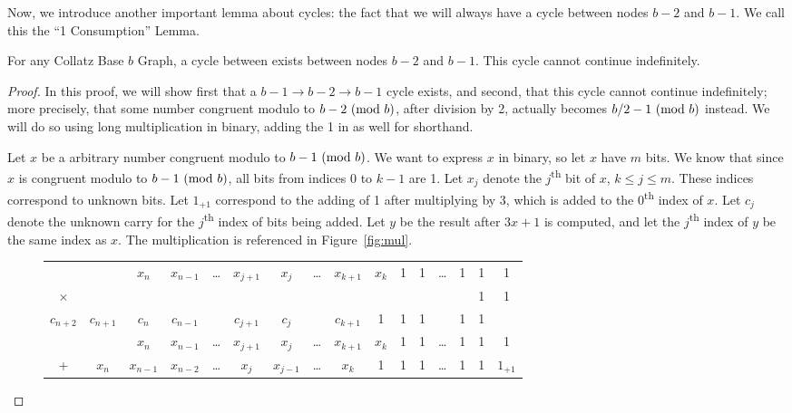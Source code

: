 Now, we introduce another important lemma about cycles: the fact that we will always have a cycle between nodes $b-2$ and $b-1$. We call this the ``1 Consumption'' Lemma.
\begin{lemma}
\label{lem:oneConsumption}
 For any Collatz Base $b$ Graph, a cycle between exists between nodes $b-2$ and $b-1$. This cycle cannot continue indefinitely.
\end{lemma}
\begin{proof}
In this proof, we will show first that a $b-1 \rightarrow b-2 \rightarrow b-1$ cycle exists, and second, that this cycle cannot continue indefinitely; more precisely, that some number congruent modulo to $b-2 \ (\mathrm{mod}\ b)$, after division by 2, actually becomes $b/2-1 \ (\mathrm{mod}\ b)$ instead. We will do so using long multiplication in binary, adding the 1 in as well for shorthand. \par
Let $x$ be a arbitrary number congruent modulo to $b-1 \ (\mathrm{mod}\ b)$. We want to express $x$ in binary, so let $x$ have $m$ bits. We know that since $x$ is congruent modulo to $b-1 \ (\mathrm{mod}\ b)$, all bits from indices 0 to $k-1$ are 1. Let $x_j$ denote the $j$\textsuperscript{th} bit of $x$, $k \leq j \leq m$. These indices correspond to unknown bits. Let $1_{+1}$ correspond to the adding of 1 after multiplying by 3, which is added to the 0\textsuperscript{th} index of $x$. Let $c_j$ denote the unknown carry for the $j$\textsuperscript{th} index of bits being added. Let $y$ be the result after $3x+1$ is computed, and let the $j$\textsuperscript{th} index of $y$ be the same index as $x$. The multiplication is referenced in Figure~\ref{fig:mul}. \par
\begin{figure}
\begin{tabular}{*{16}c}%
 & & $ x_{n}$  & $ x_{n-1}$  & \ldots & $ x_{j+1}$  & $ x_{j}$  & \ldots & $ x_{k+1}$  & $ x_{k}$  & 1 & 1 & \ldots & 1 & 1 & 1 \\
$\times$ & & & & & & & & & & & & & & 1 & 1 \\
\hline
\tiny ${\scriptscriptstyle c_{n+2}}$ & ${\scriptscriptstyle c_{n+1}}$ & ${\scriptscriptstyle c_{n}}$ & ${\scriptscriptstyle c_{n-1}}$ & & ${\scriptscriptstyle c_{j+1}}$ & ${\scriptscriptstyle c_{j}}$ & & ${\scriptscriptstyle c_{k+1}}$ & \tiny 1 & \tiny 1 &  \tiny 1 & &  \tiny 1 & \tiny 1 & \\
  & & $ x_{n}$  & $ x_{n-1}$  & \ldots & $ x_{j+1}$  & $ x_{j}$  & \ldots & $ x_{k+1}$  & $ x_{k}$  & 1 & 1 & \ldots & 1 & 1 & 1 \\
  + & $ x_{n}$  & $ x_{n-1}$  & $ x_{n-2}$  & \ldots & $ x_{j}$  & $ x_{j-1}$  & \ldots & $ x_{k}$  & 1 & 1 & 1 & \ldots & 1 & 1 & $1_{+1}$  \\

\end{tabular}
\end{figure}
\end{proof}
